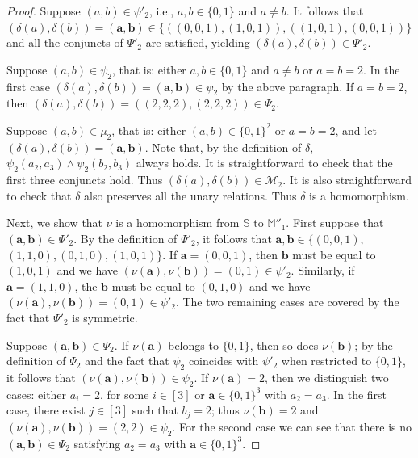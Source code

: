 \documentclass[10pt,a4paper]{amsart}
\newcommand{\struct}[1]{\mathbb{#1}}
\begin{document}
\begin{proof}
Suppose $(a,b)\in\psi'_2$, i.e., $a,b\in\{0,1\}$ and $a\neq b$. It follows that $(\delta(a),\delta(b)) = (\boldsymbol{a}, \boldsymbol{b})\in\{((0,0,1),(1,0,1)),((1,0,1),(0,0,1))\}$ and all the conjuncts of $\Psi'_2$ are satisfied, yielding $(\delta(a),\delta(b))\in\Psi'_2$.

Suppose $(a,b)\in\psi_2$, that is: either $a,b\in\{0,1\}$ and $a\neq b$ or $a=b=2$. In the first case $(\delta(a),\delta(b)) = (\boldsymbol{a}, \boldsymbol{b}) \in \psi_2$ by the above paragraph. If $a=b=2$, then $(\delta(a),\delta(b))=((2,2,2),(2,2,2)) \in \Psi_2$.

Suppose $(a,b)\in\mu_2$, that is: either $(a,b)\in\{0,1\}^2$ or $a=b=2$, and let $(\delta(a),\delta(b)) = (\boldsymbol{a}, \boldsymbol{b})$. Note that, by the definition of $\delta$, $\psi_2(a_2,a_3)\wedge\psi_2(b_2,b_3)$ always holds. It is straightforward to check that the first three conjuncts hold. Thus $(\delta(a),\delta(b))\in \mathcal M_2$. It is also straightforward to check that $\delta$ also preserves all the unary relations. Thus $\delta$ is a homomorphism.

Next, we show that $\nu$ is a homomorphism from $\struct{S}$ to $\struct{M}''_1$. First suppose that $(\boldsymbol{a},\boldsymbol{b})\in\Psi'_2$. By the definition of $\Psi'_2$, it follows that $\boldsymbol{a},\boldsymbol{b}\in\{(0,0,1),$ $(1,1,0),(0,1,0), (1,0,1)\}$. If $\boldsymbol{a}=(0,0,1)$, then $\boldsymbol{b}$ must be equal to $(1,0,1)$ and we have $(\nu(\boldsymbol{a}),\nu(\boldsymbol{b}))=(0,1)\in\psi'_2$. Similarly, if $\boldsymbol{a}=(1,1,0)$, the $\boldsymbol{b}$ must be equal to $(0,1,0)$ and we have $(\nu(\boldsymbol{a}),\nu(\boldsymbol{b}))=(0,1)\in\psi'_2$. The two remaining cases are covered by the fact that $\Psi'_2$ is symmetric.

Suppose $(\boldsymbol{a},\boldsymbol{b})\in\Psi_2$. If $\nu(\boldsymbol{a})$ belongs to $\{0,1\}$, then so does $\nu(\boldsymbol{b})$; by the definition of $\Psi_2$ and the fact that $\psi_2$ coincides with $\psi'_2$ when restricted to $\{0,1\}$, it follows that $(\nu(\boldsymbol{a}),\nu(\boldsymbol{b}))\in\psi_2$. If $\nu(\boldsymbol{a})=2$, then we distinguish two cases: either $a_i=2$, for some $i\in[3]$ or $\boldsymbol{a}\in\{0,1\}^3$ with $a_2=a_3$. In the first case, there exist $j\in[3]$ such that $b_j=2$; thus $\nu(\boldsymbol{b})=2$ and $(\nu(\boldsymbol{a}),\nu(\boldsymbol{b}))=(2,2)\in\psi_2$. For the second case we can see that there is no $(\boldsymbol{a},\boldsymbol{b})\in\Psi_2$ satisfying $a_2 = a_3$ with $\boldsymbol{a}\in\{0,1\}^3$. 


\end{proof}
\end{document}
